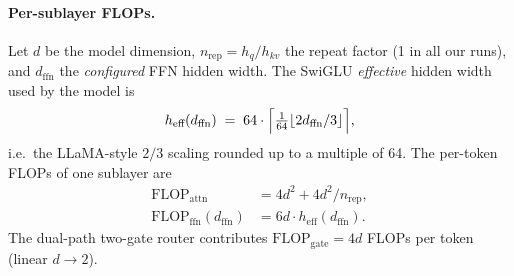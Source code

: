 \documentclass[11pt]{article}
\begin{document}
\paragraph{Per-sublayer FLOPs.}
Let $d$ be the model dimension, $n_{\text{rep}} = h_q / h_{kv}$
the repeat factor (1 in all our runs), and $d_{\text{ffn}}$
the \emph{configured} FFN hidden width. The SwiGLU \emph{effective}
hidden width used by the model is
\begin{equation}
\label{eq:heff}
h_{\text{eff}}(d_{\text{ffn}}) \;=\; 64 \cdot
\Bigl\lceil \tfrac{1}{64} \lfloor 2 d_{\text{ffn}} / 3 \rfloor \Bigr\rceil,
\end{equation}
i.e.\ the LLaMA-style $2/3$ scaling rounded up to a multiple of 64.
The per-token FLOPs of one sublayer are
\begin{align}
\mathrm{FLOP}_{\text{attn}} &= 4 d^2 + 4 d^2 / n_{\text{rep}}, \\
\mathrm{FLOP}_{\text{ffn}}(d_{\text{ffn}}) &= 6 d \cdot h_{\text{eff}}(d_{\text{ffn}}).
\end{align}
The dual-path two-gate router contributes
$\mathrm{FLOP}_{\text{gate}} = 4 d$ FLOPs per token (linear
$d \to 2$).
\end{document}
